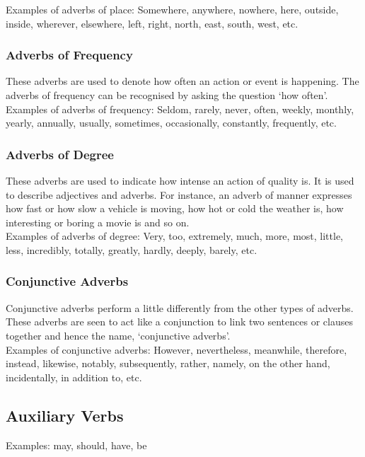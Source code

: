 Examples of adverbs of place: Somewhere, anywhere, nowhere, here, outside, inside, wherever, elsewhere, left, right, north, east, south, west, etc.

\subsubsection{Adverbs of Frequency \cite{byjus-english-types-of-adverbs}}
These adverbs are used to denote how often an action or event is happening. The adverbs of frequency can be recognised by asking the question ‘how often’.\\

Examples of adverbs of frequency: Seldom, rarely, never, often, weekly, monthly, yearly, annually, usually, sometimes, occasionally, constantly, frequently, etc.

\subsubsection{Adverbs of Degree \cite{byjus-english-types-of-adverbs}}
These adverbs are used to indicate how intense an action of quality is. It is used to describe adjectives and adverbs. For instance, an adverb of manner expresses how fast or how slow a vehicle is moving, how hot or cold the weather is, how interesting or boring a movie is and so on. \\

Examples of adverbs of degree: Very, too, extremely, much, more, most, little, less, incredibly, totally, greatly, hardly, deeply, barely, etc.


\subsubsection{Conjunctive Adverbs \cite{byjus-english-types-of-adverbs}}
Conjunctive adverbs perform a little differently from the other types of adverbs. These adverbs are seen to act like a conjunction to link two sentences or clauses together and hence the name, ‘conjunctive adverbs’.\\

Examples of conjunctive adverbs: However, nevertheless, meanwhile, therefore, instead, likewise, notably, subsequently, rather, namely, on the other hand, incidentally, in addition to, etc.




\subsection{Auxiliary Verbs}
Examples: may, should, have, be

